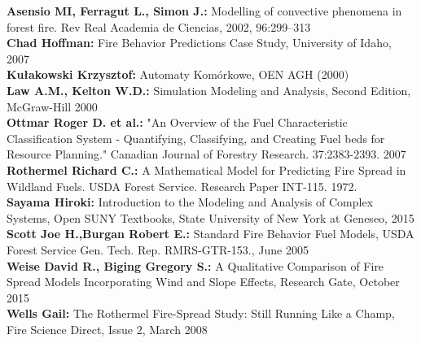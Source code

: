 \documentclass[a4paper, 11pt]{article}
\begin{document}
\textbf{Asensio MI, Ferragut L., Simon J.:} Modelling of convective phenomena in forest fire. Rev Real Academia de Ciencias, 2002, 96:299–313\\
\textbf{Chad Hoffman:} Fire Behavior Predictions Case Study, University of Idaho, 2007\\
\textbf{Kułakowski Krzysztof:} Automaty Komórkowe, OEN AGH (2000) \\
\textbf{Law A.M., Kelton W.D.:} Simulation Modeling and Analysis, Second Edition, McGraw-Hill 2000\\
\textbf{Ottmar Roger D. et al.:} "An Overview of the Fuel Characteristic Classification System - Quantifying, Classifying, and Creating Fuel beds for Resource Planning." Canadian Journal of Forestry Research. 37:2383-2393. 2007\\
\textbf{Rothermel Richard C.:} A Mathematical Model for Predicting Fire Spread in Wildland Fuels. USDA Forest Service. Research Paper INT-115. 1972.\\
\textbf{Sayama Hiroki:} Introduction to the Modeling and Analysis of Complex Systems, Open SUNY Textbooks, State University of New York at Geneseo, 2015\\	
\textbf{Scott Joe H.,Burgan Robert E.:} Standard Fire Behavior Fuel Models, USDA Forest Service Gen. Tech. Rep. RMRS-GTR-153., June 2005\\	
\textbf{Weise David R., Biging Gregory S.:} A Qualitative Comparison of Fire Spread Models Incorporating Wind and Slope Effects, Research Gate, October 2015\\
\textbf{Wells Gail:} The Rothermel Fire-Spread Study: Still Running Like a Champ, Fire Science Direct, Issue 2, March 2008\\




\end{document}
